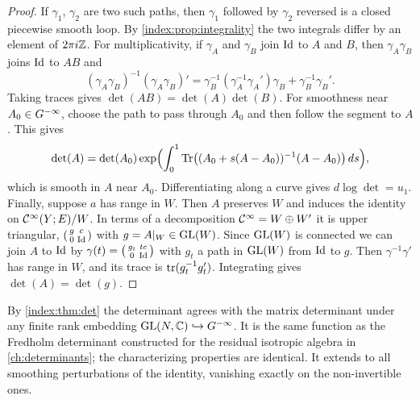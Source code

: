 \begin{proof}
  If $\gamma_1$, $\gamma_2$ are two such paths, then $\gamma_1$ followed by
  $\gamma_2$ reversed is a closed piecewise smooth loop. By
  \cref{index:prop:integrality} the two integrals differ by an element of
  $2\pi i\mathbb{Z}$. For multiplicativity, if $\gamma_A$ and $\gamma_B$ join $\operatorname{Id}$ to
  $A$ and $B$, then $\gamma_A\gamma_B$ joins $\operatorname{Id}$ to $AB$ and
  \begin{equation*}
    (\gamma_A\gamma_B)^{-1}(\gamma_A\gamma_B)'=\gamma_B^{-1}
    (\gamma_A^{-1}\gamma_A')\gamma_B+\gamma_B^{-1}\gamma_B'.
  \end{equation*}
  Taking traces gives $\det(AB)=\det(A)\det(B)$. For smoothness near
  $A_0\in G^{-\infty}$, choose the path to pass through $A_0$ and then follow the
  segment to $A$. This gives
  \begin{equation*}
    \det(A)=\det(A_0)\exp\Bigl(\int_0^1\operatorname{Tr}\bigl((A_0+s(A-A_0))^{-1}(A-A_0)
    \bigr)\,ds\Bigr),
  \end{equation*}
  which is smooth in $A$ near $A_0$. Differentiating along a curve gives
  $d\log\det=u_1$. Finally, suppose $a$ has range in $W$. Then $A$ preserves
  $W$ and induces the identity on $\mathcal{C}^\infty(Y;E)/W$. In terms of a decomposition
  $\mathcal{C}^\infty=W\oplus W'$ it is upper triangular,
  $\left(\begin{smallmatrix}g&c\\0&\operatorname{Id}\end{smallmatrix}\right)$ with
  $g=A|_W\in\operatorname{GL}(W)$. Since $\operatorname{GL}(W)$ is connected we can join $A$ to $\operatorname{Id}$ by
  $\gamma(t)=\left(\begin{smallmatrix}g_t&tc\\0&\operatorname{Id}\end{smallmatrix}\right)$
  with $g_t$ a path in $\operatorname{GL}(W)$ from $\operatorname{Id}$ to $g$. Then
  $\gamma^{-1}\gamma'$ has range in $W$, and its trace is
  $\operatorname{tr}(g_t^{-1}g_t')$. Integrating gives $\det(A)=\det(g)$.
\end{proof}

By \cref{index:thm:det} the determinant agrees with the matrix determinant
under any finite rank embedding $\operatorname{GL}(N,\mathbb{C})\hookrightarrow G^{-\infty}$. It is the
same function as the Fredholm determinant constructed for the residual
isotropic algebra in \cref{ch:determinants}; the characterizing properties
are identical. It extends to all smoothing perturbations of the identity,
vanishing exactly on the non-invertible ones.

